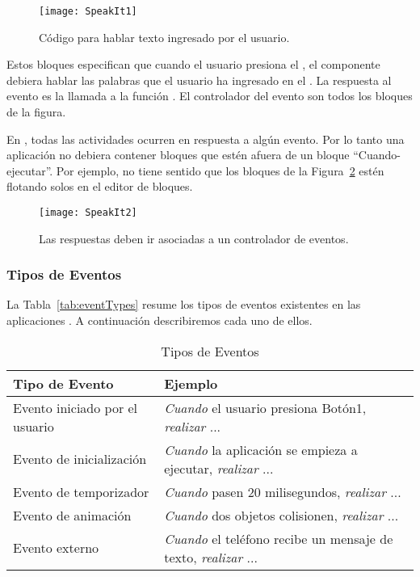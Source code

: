 \begin{figure}[H]
  \centering
  \texttt{[image: SpeakIt1]}
  \caption{Código para hablar texto ingresado por el usuario.}
  \label{fig:speakit1}
\end{figure}

Estos bloques especifican que cuando el usuario presiona el , el componente  debiera hablar las palabras que el usuario ha ingresado en el . La respuesta al evento  es la llamada a la función . El controlador del evento son todos los bloques de la figura.

En \AppInventor, todas las actividades ocurren en respuesta a algún evento. Por lo tanto una aplicación no debiera contener bloques que estén afuera de un bloque “Cuando-ejecutar”. Por ejemplo, no tiene sentido que los bloques de la Figura~\ref{fig:speakit2} estén flotando solos en el editor de bloques.

\begin{figure}[H]
  \centering
  \texttt{[image: SpeakIt2]}
  \caption{Las respuestas deben ir asociadas a un controlador de eventos.}
  \label{fig:speakit2}
\end{figure}

\subsubsection*{Tipos de Eventos}

La Tabla~\ref{tab:eventTypes} resume los tipos de eventos existentes en las aplicaciones \AppInventor. A continuación describiremos cada uno de ellos.

\begin{table}[H]
  \begin{small}
    \begin{tabular}{|l|l|}
      \hline
      \textbf{Tipo de Evento} & \textbf{Ejemplo}\\
      \hline
      Evento iniciado por el usuario & \emph{Cuando} el usuario presiona Botón1, \emph{realizar} ...\\
      \hline
      Evento de inicialización & \emph{Cuando} la aplicación se empieza a ejecutar, \emph{realizar} ...\\
      \hline
      Evento de temporizador & \emph{Cuando} pasen 20 milisegundos, \emph{realizar} ...\\
      \hline
      Evento de animación & \emph{Cuando} dos objetos colisionen, \emph{realizar} ...\\
      \hline
      Evento externo & \emph{Cuando} el teléfono recibe un mensaje de texto, \emph{realizar} ...\\
      \hline
    \end{tabular}
  \end{small}
  \caption{Tipos de Eventos}
  \label{fig:eventTypes}
\end{table}

